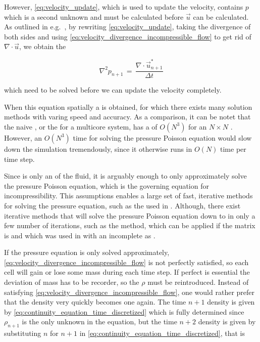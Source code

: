 However, \eqref{eq:velocity_update}, which is used to update the velocity, contains $p$ which is a second unknown and must be calculated before $\vec{u}$ can be calculated. As outlined in e.g.\ \citep{Losasso2004}, by rewriting \eqref{eq:velocity_update}, taking the divergence of both sides and using \eqref{eq:velocity_divergence_incompressible_flow} to get rid of $\nabla\cdot\vec{u}$, we obtain the 

\begin{equation} \label{eq:pressure_poissin_equation_incompressible_flow}
\nabla^2 p_{n+1} \,=\, \frac{\nabla\cdot\vec{u}^*_{n+1}}{\Delta t}
\end{equation}

which need to be solved before we can update the velocity completely.

When  this equation spatially a  is obtained, for which there exists many solution methods with varing speed and accuracy. As a comparison, it can be notet that the naive  \algorithm, or the  \algorithm for a multicore system, has a  of $O(N^3)$ for an $N\times N$ . However, an $O(N^3)$ time for solving the pressure Poisson equation would slow down the simulation tremendously, since it otherwise runs in $O(N)$ time per time step.

Since \incompressibility is only an \approximate \property of the fluid, it is arguably enough to only approximately solve the pressure Poisson equation, which is the governing equation for incompressibility. This assumptions enables a large set of fast, iterative methods for solving the pressure equation, such as the   used in \citep{Popinet2003}. Although, there exist iterative methods that will solve the pressure Poisson equation down to  in only a few number of iterations, such as the \PCG method, which can be applied if the matrix is  and which was used in \citep{Losasso2004} with an incomplete  as \preconditioner.

If the pressure equation is only solved approximately, \eqref{eq:velocity_divergence_incompressible_flow} is not perfectly satisfied, so each cell will gain or lose some mass during each time step. If perfect  is essential the deviation of mass has to be recorder, so the  $\rho$ must be reintroduced. Instead of satisfying \eqref{eq:velocity_divergence_incompressible_flow}, one would rather prefer that the density very quickly becomes one again. The time $n+1$ density is given by \eqref{eq:continuity_equation_time_discretized} which is fully determined since $\rho_{n+1}$ is the only unknown in the equation, but the time $n+2$ density is given by substituting $n$ for $n+1$ in \eqref{eq:continuity_equation_time_discretized}, that is

